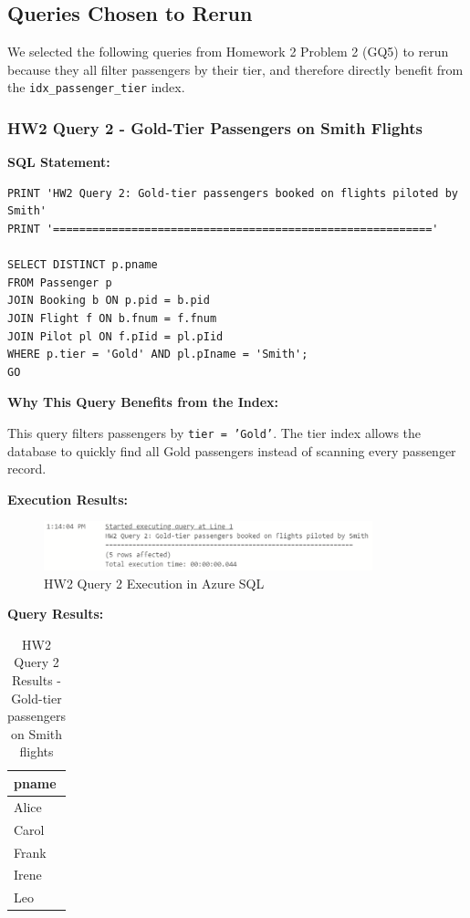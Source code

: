 \documentclass[12pt]{article}
\begin{document}
\newpage
\subsection{Queries Chosen to Rerun}

We selected the following queries from Homework 2 Problem 2 (GQ5) to rerun because they all filter passengers by their tier, and therefore directly benefit from the \texttt{idx\_passenger\_tier} index.

\subsubsection{HW2 Query 2 - Gold-Tier Passengers on Smith Flights}

\textbf{SQL Statement:}
\begin{lstlisting}
PRINT 'HW2 Query 2: Gold-tier passengers booked on flights piloted by Smith'
PRINT '=========================================================='

SELECT DISTINCT p.pname
FROM Passenger p
JOIN Booking b ON p.pid = b.pid
JOIN Flight f ON b.fnum = f.fnum
JOIN Pilot pl ON f.pIid = pl.pIid
WHERE p.tier = 'Gold' AND pl.pIname = 'Smith';
GO
\end{lstlisting}

\textbf{Why This Query Benefits from the Index:}

This query filters passengers by \texttt{tier = 'Gold'}. The tier index allows the database to quickly find all Gold passengers instead of scanning every passenger record.

\textbf{Execution Results:}

\begin{figure}[h]
\centering
\includegraphics[width=0.85\textwidth]{../../../Screenshots/Problem2/Quer2_Execution.png}
\caption{HW2 Query 2 Execution in Azure SQL}
\label{fig:query2_execution}
\end{figure}

\textbf{Query Results:}

\begin{table}[h]
\centering
\begin{tabular}{|l|}
\hline
\textbf{pname} \\
\hline
Alice \\
Carol \\
Frank \\
Irene \\
Leo \\
\hline
\end{tabular}
\caption{HW2 Query 2 Results - Gold-tier passengers on Smith flights}
\end{table}
\end{document}
